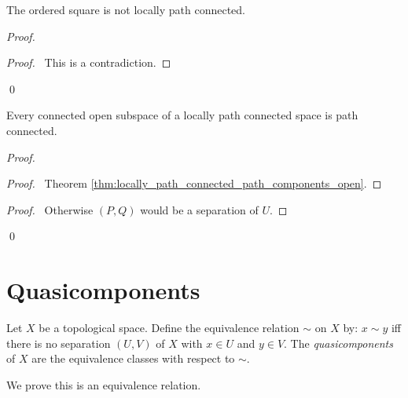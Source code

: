 \begin{ex}
The ordered square is not locally path connected.
\end{ex}

\begin{proof}
\pf
{}
\qedstep
\begin{proof}
	\pf\ This is a contradiction.
\end{proof}
\qed
\end{proof}

\begin{prop}
Every connected open subspace of a locally path connected space is path connected.
\end{prop}

\begin{proof}
\pf
{}
\begin{proof}
	\pf\ Theorem \ref{thm:locally_path_connected_path_components_open}.
\end{proof}
\begin{proof}
	\pf\ Otherwise $(P,Q)$ would be a separation of $U$.
\end{proof}
\qed
\end{proof}

\section{Quasicomponents}

\begin{df}[Quasicomponent]
Let $X$ be a topological space. Define the equivalence relation $\sim$ on $X$ by: $x \sim y$ iff there is no separation $(U,V)$ of $X$ with $x \in U$ and $y \in V$. The \emph{quasicomponents} of $X$ are the equivalence classes with respect to $\sim$.

We prove this is an equivalence relation.
\end{df}

